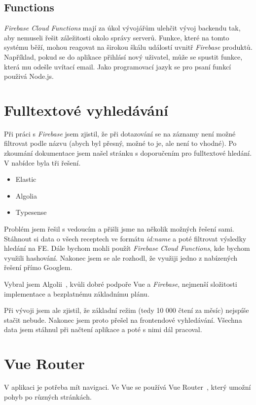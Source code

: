 \subsection{Functions}
\emph{Firebase Cloud Functions} mají za úkol vývojářům ulehčit vývoj backendu tak, aby nemuseli řešit záležitosti okolo správy serverů.
Funkce, které na tomto systému běží, mohou reagovat na širokou škálu událostí uvnitř \emph{Firebase} produktů. Například, pokud se do aplikace
přihlásí nový uživatel, může se spustit funkce, která mu odešle uvítací email. Jako programovací jazyk se pro psaní funkcí použivá Node.js.~\cite{FirebaseFunctions}

\section{Fulltextové vyhledávání}
Při práci s \emph{Firebase} jsem zjistil, že při dotazování se na záznamy není možné filtrovat podle názvu
(abych byl přesný, možné to je, ale není to vhodné). Po zkoumání dokumentace jsem našel stránku s doporučením pro
fulltextové hledání. V nabídce byla tři řešení.~\cite{FulltextSearch}

\begin{itemize}
    \item Elastic
    \item Algolia
    \item Typesense
\end{itemize}

Problém jsem řešil s vedoucím a přišli jsme na několik možných řešení sami. Stáhnout si data o všech receptech ve formátu
\emph{id:name} a poté filtrovat výsledky hledání na FE. Dále bychom mohli použít \emph{Firebase Cloud Functions}, kde bychom
využili hashování. Nakonec jsem se ale rozhodl, že využiji jedno z nabízených řešení přímo Googlem.

Vybral jsem Algolii~\cite{Algolia}, kvůli dobré podpoře Vue a \emph{Firebase}, nejmenší složitosti implementace a bezplatnému základnímu plánu.

Při vývoji jsem ale zjistil, že základní režim (tedy 10 000 čtení za měsíc) nejspíše stačit nebude. Nakonec jsem proto přešel na
frontendové vyhledávání. Všechna data jsem stáhnul při načtení aplikace a poté s nimi dál pracoval.

\section{Vue Router} %
V aplikaci je potřeba mít navigaci. Ve Vue se používá Vue Router~\cite{VueRouter}, který umožní pohyb po různých stránkách.

